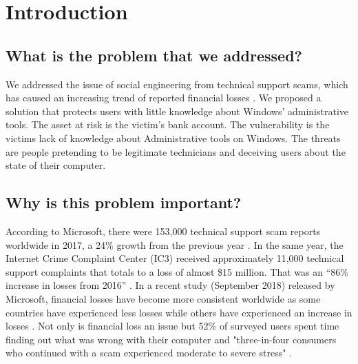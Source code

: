 \documentclass[final]{IEEEtran}
\begin{document}
\section{Introduction} %
%
%

\subsection{What is the problem that we addressed?}
We addressed the issue of social engineering from technical support scams, which has caused an increasing trend of reported financial losses \cite{b1}. We proposed a solution that protects users with little knowledge about Windows' administrative tools. The asset at risk is the victim's bank account. The vulnerability is the victims lack of knowledge about Administrative tools on Windows. The threats are people pretending to be legitimate technicians and deceiving users about the state of their computer.

\subsection{Why is this problem important?}
According to Microsoft, there were 153,000 technical support scam reports worldwide in 2017, a 24\% growth from the previous year \cite[Fig 1]{b3}. In the same year, the Internet Crime Complaint Center (IC3) received approximately 11,000 technical support complaints that totals to a loss of almost \$15 million. That was an “86\% increase in losses from 2016” \cite{b1}. In a recent study (September 2018) released by Microsoft, financial losses have become more consistent worldwide as some countries have experienced less losses while others have experienced an increase in losses \cite[p.12]{b7}. Not only is financial loss an issue but 52\% of surveyed users spent time finding out what was wrong with their computer and "three-in-four consumers who continued with a scam experienced moderate to severe stress" \cite[Fig 3]{b7}.
\end{document}
